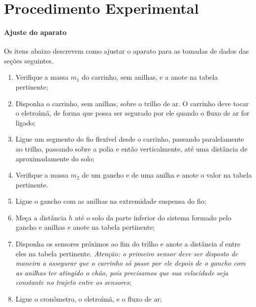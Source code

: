 \section{Procedimento Experimental}

\paragraph{Ajuste do aparato}
\label{subsec:ajustedoaparatoenergia}

Os itens abaixo descrevem como ajustar o aparato para as tomadas de dados das seções seguintes.
\begin{enumerate}
    \item Verifique a massa $m_1$ do carrinho, sem anilhas, e a anote na tabela pertinente;
	\item Disponha o carrinho, sem anilhas, sobre o trilho de ar. O carrinho deve tocar o eletroímã, de forma que possa ser segurado por ele quando o fluxo de ar for ligado;
	\item Ligue um segmento do fio flexível desde o carrinho, passando paralelamente ao trilho, passando sobre a polia e então verticalmente, até uma distância de aproximadamente  do solo;
	\item Verifique a massa $m_2$ de um gancho e de uma anilha e anote o valor na tabela pertinente.
	\item Ligue o gancho com as anilhas na extremidade suspensa do fio;
	\item Meça a distância $h$ até o solo da parte inferior do sistema formado pelo gancho e anilhas e anote na tabela pertinente;
	\item Disponha os sensores próximos ao fim do trilho e anote a distância $d$ entre eles na tabela pertinente. \emph{Atenção: o primeiro sensor deve ser disposto de maneira a assegurar que o carrinho só passe por ele depois de o gancho com as anilhas ter atingido o chão, pois precisamos que sua velocidade seja constante no trajeto entre os sensores};
	\item Ligue o cronômetro, o eletroímã, e o fluxo de ar;
\end{enumerate}

